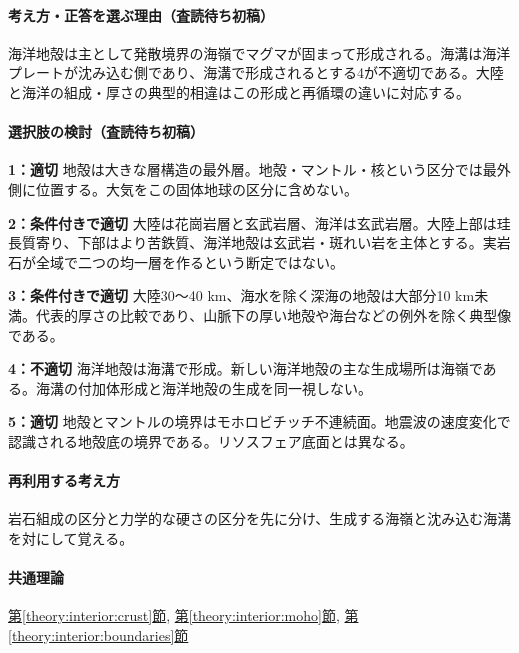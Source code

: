 \paragraph{考え方・正答を選ぶ理由（査読待ち初稿）} 海洋地殻は主として発散境界の海嶺でマグマが固まって形成される。海溝は海洋プレートが沈み込む側であり、海溝で形成されるとする4が不適切である。大陸と海洋の組成・厚さの典型的相違はこの形成と再循環の違いに対応する。

\paragraph{選択肢の検討（査読待ち初稿）}\mbox{}\par

\noindent\textbf{1：適切} 地殻は大きな層構造の最外層。地殻・マントル・核という区分では最外側に位置する。大気をこの固体地球の区分に含めない。\par

\noindent\textbf{2：条件付きで適切} 大陸は花崗岩層と玄武岩層、海洋は玄武岩層。大陸上部は珪長質寄り、下部はより苦鉄質、海洋地殻は玄武岩・斑れい岩を主体とする。実岩石が全域で二つの均一層を作るという断定ではない。\par

\noindent\textbf{3：条件付きで適切} 大陸30〜40 km、海水を除く深海の地殻は大部分10 km未満。代表的厚さの比較であり、山脈下の厚い地殻や海台などの例外を除く典型像である。\par

\noindent\textbf{4：不適切} 海洋地殻は海溝で形成。新しい海洋地殻の主な生成場所は海嶺である。海溝の付加体形成と海洋地殻の生成を同一視しない。\par

\noindent\textbf{5：適切} 地殻とマントルの境界はモホロビチッチ不連続面。地震波の速度変化で認識される地殻底の境界である。リソスフェア底面とは異なる。\par

\paragraph{再利用する考え方} 岩石組成の区分と力学的な硬さの区分を先に分け、生成する海嶺と沈み込む海溝を対にして覚える。

\paragraph{共通理論} \hyperref[theory:interior:crust]{第\ref*{theory:interior:crust}節}, \hyperref[theory:interior:moho]{第\ref*{theory:interior:moho}節}, \hyperref[theory:interior:boundaries]{第\ref*{theory:interior:boundaries}節}

